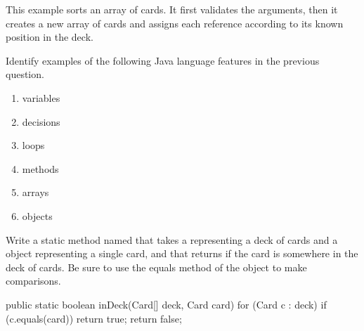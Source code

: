 \begin{answer}
This example sorts an array of cards.
It first validates the arguments, then it creates a new array of cards and assigns each  reference according to its known position in the deck.
\end{answer}


\Q Identify examples of the following Java language features in the previous question.
\begin{enumerate}
\item variables 
\item decisions 
\item loops 
\item methods 
\item arrays 
\item objects 
\end{enumerate}



\Q \label{search}
Write a static method named  that takes a  representing a deck of cards and a  object representing a single card, and that returns  if the card is somewhere in the deck of cards. Be sure to use the equals method of the  object to make comparisons.

\begin{answer}[10em]
\begin{javaans}
public static boolean inDeck(Card[] deck, Card card) {
    for (Card c : deck) {
        if (c.equals(card)) {
            return true;
        }
    }
    return false;
}
\end{javaans}
\end{answer}
